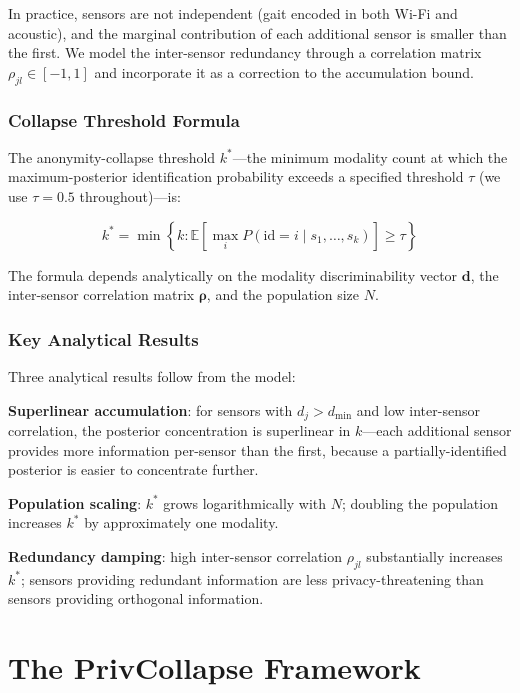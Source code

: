 \documentclass[sigconf,nonacm]{acmart}
\begin{document}
In practice, sensors are not independent (gait encoded in
both Wi-Fi and acoustic), and the marginal contribution of
each additional sensor is smaller than the first. We model the
inter-sensor redundancy through a correlation matrix
$\rho_{jl} \in [-1,1]$ and incorporate it as a correction to
the accumulation bound.

\subsubsection{Collapse Threshold Formula}

The anonymity-collapse threshold $k^*$---the minimum modality
count at which the maximum-posterior identification probability
exceeds a specified threshold $\tau$ (we use $\tau = 0.5$
throughout)---is:

\begin{equation}
  k^* = \min\left\{k : \mathbb{E}\left[
  \max_i P(\text{id}=i \mid s_1,\ldots,s_k)\right] \geq \tau
  \right\}
\label{eq:threshold}
\end{equation}

The formula depends analytically on the modality discriminability
vector $\mathbf{d}$, the inter-sensor correlation matrix
$\boldsymbol{\rho}$, and the population size $N$.

\subsubsection{Key Analytical Results}

Three analytical results follow from the model:

\textbf{Superlinear accumulation}: for sensors with
$d_j > d_{\text{min}}$ and low inter-sensor correlation, the
posterior concentration is superlinear in $k$---each additional
sensor provides more information per-sensor than the first,
because a partially-identified posterior is easier to concentrate
further.

\textbf{Population scaling}: $k^*$ grows logarithmically with
$N$; doubling the population increases $k^*$ by approximately
one modality.

\textbf{Redundancy damping}: high inter-sensor correlation
$\rho_{jl}$ substantially increases $k^*$; sensors providing
redundant information are less privacy-threatening than sensors
providing orthogonal information.

\section{The PrivCollapse Framework}
\end{document}
